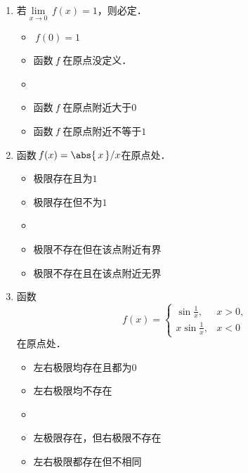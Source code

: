 \begin{enumerate}
\item 若\(\lim\limits_{x\to0} \,f(x) = 1\)，则必定\uline{\makebox[6em]{}}．
  \begin{itemize}
    \renewcommand{\labelitemi}{\faCircleThin}
  \item \(\,f(0) = 1\)
  \item 函数\(\,f\mkern2mu\)在原点没定义．
    \ifshowsol
    \item[\faCircle]
    \else
    \item
    \fi
    函数\(\,f\mkern2mu\)在原点附近大于\(0\)
  \item 函数\(\,f\mkern2mu\)在原点附近不等于\(1\)
  \end{itemize}

\item 函数\(\,f(x) = \abs{\,x\,} / x\)在原点处\uline{\makebox[6em]{}}．
  \begin{itemize}
    \renewcommand{\labelitemi}{\faCircleThin}
  \item 极限存在且为\(1\)
  \item 极限存在但不为\(1\)
    \ifshowsol
    \item[\faCircle]
    \else
    \item
    \fi
    极限不存在但在该点附近有界
  \item 极限不存在且在该点附近无界
  \end{itemize}

\item 函数
  \begin{equation*}
    f(x) =
    \begin{cases}
      \sin\frac1x, & x > 0, \\
      x \sin\frac1x, & x < 0
    \end{cases}
  \end{equation*}
  在原点处\uline{\makebox[6em]{}}．
  \begin{itemize}
    \renewcommand{\labelitemi}{\faCircleThin}
  \item 左右极限均存在且都为\(0\)
  \item 左右极限均不存在
    \ifshowsol
    \item[\faCircle]
    \else
    \item
    \fi
    左极限存在，但右极限不存在
  \item 左右极限都存在但不相同
  \end{itemize}


\end{enumerate}
